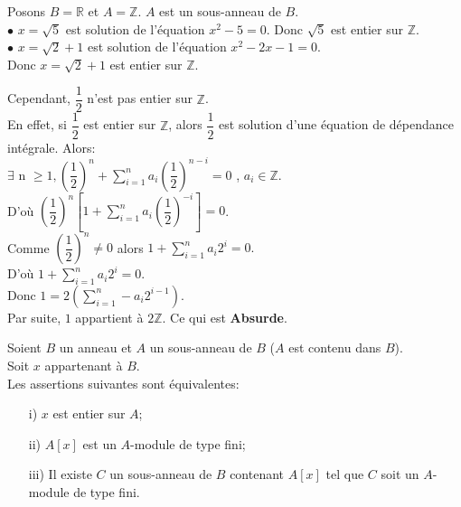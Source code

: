 \begin{monexemple}
	Posons $B = \mathbb{R}$ et $A = \mathbb{Z}$. $A$ est un sous-anneau de $B$.\\
	$\bullet$ $x = \sqrt{5}$ est solution de l'équation $x^2 - 5=0$. Donc $\sqrt{5}$ est entier sur $\mathbb{Z}$.\\
	$\bullet$ $x = \sqrt{2}+1$ est solution de l'équation $x^2 - 2x -1=0$.\\Donc $x = \sqrt{2}+1$ est entier sur $\mathbb{Z}$.\\
\end{monexemple}
\begin{moncontreexemple}
	Cependant, $\dfrac{1}{2}$ n'est pas entier sur $\mathbb{Z}$.\\
	En effet, si $\dfrac{1}{2}$ est entier sur $\mathbb{Z}$, alors $\dfrac{1}{2}$ est solution d'une équation de dépendance intégrale. Alors: \\
	$\exists$ n $\geq 1 , \left(\dfrac{1}{2} \right)^n + \sum\limits_{i=1}^{n} a_i \left(\dfrac{1}{2} \right)^{n-i} = 0$ , $a_i \in\mathbb{Z}$.\\
	D'où $\left(\dfrac{1}{2} \right)^n \left[1+\sum\limits_{i=1}^{n} a_i \left(\dfrac{1}{2} \right)^{-i}\right] = 0$.\\
	Comme $\left(\dfrac{1}{2} \right)^n \neq 0$ alors $1+\sum\limits_{i=1}^{n} a_i2^{i} = 0.$\\D'où $1+\sum\limits_{i=1}^{n} a_i2^{i} = 0.$\\ Donc $1 = 2\left(\sum\limits_{i=1}^{n} -a_i 2^{i-1}\right).$\\Par suite, $ 1$ appartient à $ 2\mathbb{Z}.$ Ce qui est \textbf{Absurde}.
\end{moncontreexemple}
\begin{maproposition}
	\label{maprop12}
	Soient $B$ un anneau et $A$ un sous-anneau de $B$ ($A $ est contenu dans $ B$).\\
	Soit $x $ appartenant à $ B$. \\
	Les assertions suivantes sont équivalentes:
	\begin{enumerate}
		\item[i)]$x$ est entier sur $A$;
		\item[ii)]$A\left[ x\right]$ est un $A$-module de type fini;
		\item[iii)]Il existe $C$ un sous-anneau de $B$ contenant $A\left[ x\right]$ tel que $C$ soit un $A$-module de type fini.
	\end{enumerate}
\end{maproposition}
